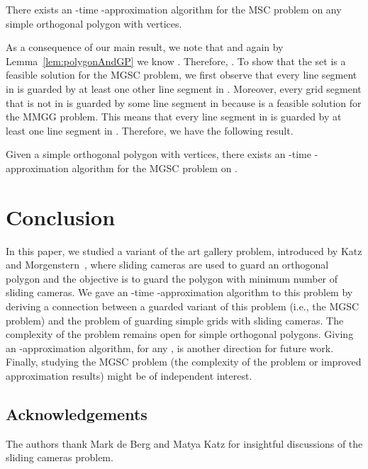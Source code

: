 \documentclass{llncs}
\begin{document}
\begin{theorem}
\label{thm:msc3Approx}
There exists an -time -approximation algorithm for the MSC problem on any simple orthogonal polygon  with  vertices.
\end{theorem}

As a consequence of our main result, we note that  and again by Lemma~\ref{lem:polygonAndGP} we know . Therefore, . To show that the set  is a feasible solution for the MGSC problem, we first observe that every line segment in  is guarded by at least one other line segment in . Moreover, every grid segment that is not in  is guarded by some line segment in  because  is a feasible solution for the MMGG problem. This means that every line segment in  is guarded by at least one line segment in . Therefore, we have the following result.
\begin{corollary}
Given a simple orthogonal polygon  with  vertices, there exists an -time -approximation algorithm for the MGSC problem on .
\end{corollary}

\section{Conclusion}
\label{sec:conclusion}
In this paper, we studied a variant of the art gallery problem, introduced by Katz and Morgenstern~\cite{katz2011},
where sliding cameras are used to guard an orthogonal polygon and the objective is to guard the polygon with
minimum number of sliding cameras. We gave an -time -approximation algorithm to this problem
by deriving a connection between a guarded variant of this problem (i.e., the MGSC problem) and the problem of guarding simple grids with sliding cameras. The complexity of the
problem remains open for simple orthogonal polygons. Giving an -approximation algorithm, for any
, is another direction for future work. Finally, studying the MGSC problem (the complexity of the problem or improved approximation results) might be of independent interest.\\


\subsection*{Acknowledgements} The authors thank Mark de Berg and Matya Katz for
insightful discussions of the sliding cameras problem.



\end{document}
